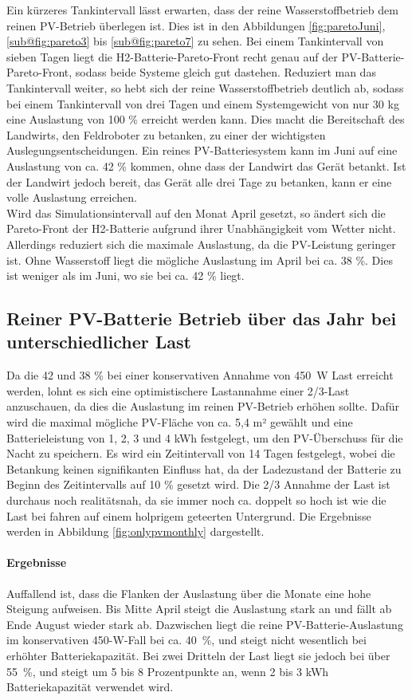 Ein kürzeres Tankintervall lässt erwarten, dass der reine Wasserstoffbetrieb dem reinen PV-Betrieb überlegen ist. 
Dies ist in den Abbildungen \ref{fig:paretoJuni}, \ref{sub@fig:pareto3} bis \ref{sub@fig:pareto7} zu sehen. Bei einem Tankintervall von sieben Tagen liegt die H2-Batterie-Pareto-Front recht genau auf der PV-Batterie-Pareto-Front, sodass beide Systeme gleich gut dastehen. Reduziert man das Tankintervall weiter, so hebt sich der reine Wasserstoffbetrieb deutlich ab, sodass bei einem Tankintervall von drei Tagen und einem Systemgewicht von nur 30 kg eine Auslastung von 100 \% erreicht werden kann. Dies macht die Bereitschaft des Landwirts, den Feldroboter zu betanken, zu einer der wichtigsten Auslegungsentscheidungen. Ein reines PV-Batteriesystem kann im Juni auf eine Auslastung von ca. 42 \% kommen, ohne dass der Landwirt das Gerät betankt. Ist der Landwirt jedoch bereit, das Gerät alle drei Tage zu betanken, kann er eine volle Auslastung erreichen. \\

Wird das Simulationsintervall auf den Monat April gesetzt, so ändert sich die Pareto-Front der H2-Batterie aufgrund ihrer Unabhängigkeit vom Wetter nicht. Allerdings reduziert sich die maximale Auslastung, da die PV-Leistung geringer ist. Ohne Wasserstoff liegt die mögliche Auslastung im April bei ca. 38 \%. Dies ist weniger als im Juni, wo sie bei ca. 42 \% liegt.

\subsection{Reiner PV-Batterie Betrieb über das Jahr bei unterschiedlicher Last}
Da die 42 und 38 \% bei einer konservativen Annahme von 450~W Last erreicht werden, lohnt es sich eine optimistischere Lastannahme einer 2/3-Last anzuschauen, da dies die Auslastung im reinen PV-Betrieb erhöhen sollte. Dafür wird die maximal mögliche PV-Fläche von ca. 5,4 m² gewählt und eine Batterieleistung von 1, 2, 3 und 4 kWh festgelegt, um den PV-Überschuss für die Nacht zu speichern. Es wird ein Zeitintervall von 14 Tagen festgelegt, wobei die Betankung keinen signifikanten Einfluss hat, da der Ladezustand der Batterie zu Beginn des Zeitintervalls auf 10 \% gesetzt wird. Die 2/3 Annahme der Last ist durchaus noch realitätsnah, da sie immer noch ca. doppelt so hoch ist wie die Last bei fahren auf einem holprigem geteerten Untergrund. Die Ergebnisse werden in Abbildung \ref{fig:onlypvmonthly} dargestellt. \\
\paragraph{Ergebnisse}
Auffallend ist, dass die Flanken der Auslastung über die Monate eine hohe Steigung aufweisen. Bis Mitte April steigt die Auslastung stark an und fällt ab Ende August wieder stark ab. Dazwischen liegt die reine PV-Batterie-Auslastung im konservativen 450-W-Fall bei ca. 40~\%, und steigt nicht wesentlich bei erhöhter Batteriekapazität. Bei zwei Dritteln der Last liegt sie jedoch bei über 55~\%, und steigt um 5 bis 8 Prozentpunkte an, wenn 2 bis 3 kWh Batteriekapazität verwendet wird.\\
